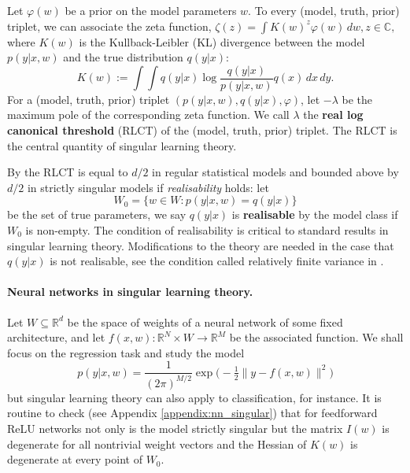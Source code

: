 \documentclass[11pt]{article}
\def\lto{\longrightarrow}
\numberwithin{equation}{section}
\theoremstyle{plain}
\theoremstyle{definition}
\newtheorem{definition}{Definition}
\begin{document}
Let  $\varphi(w)$ be a prior on the model parameters $w$.
To every (model, truth, prior) triplet, we can associate the zeta function,
$
\zeta(z) = \int K(w)^z \varphi(w) \,dw, z \in \mathbb C,
$
where $K(w)$ is the Kullback-Leibler (KL) divergence between the model $p(y|x,w)$ and the true distribution $q(y|x)$:
\begin{equation}
	K(w) := \int \!\int q(y|x) \log \frac{ q(y|x) }{ p(y|x,w) } q(x) \,dx \,dy.
	\label{eq:KL}
\end{equation}
For a (model, truth, prior) triplet $(p(y|x,w),q(y|x),\varphi)$, let $-\lambda$ be the maximum pole of the corresponding zeta function. We call $\lambda$ the \textbf{real log canonical threshold} (RLCT) \citep{watanabe_algebraic_2009} of the (model, truth, prior) triplet. The RLCT is the central quantity of singular learning theory. 

By {\citet[Theorem 6.4]{watanabe_algebraic_2009}} the RLCT is equal to $d/2$ in regular statistical models and bounded above by $d/2$ in strictly singular models if \textit{realisability} holds: let 
$$
W_0 = \{w \in W: p(y|x,w)=q(y|x)\}
$$
be the set of true parameters,
we say $q(y|x)$ is \textbf{realisable} by the model class if $W_0$ is non-empty.
The condition of realisability is critical to standard results in singular learning theory. Modifications to the theory are needed in the case that $q(y|x)$ is not realisable, see the condition called relatively finite variance in \citet{watanabe_mathematical_2018}.

\paragraph{Neural networks in singular learning theory.} Let $W \subseteq \mathbb{R}^d$ be the space of weights of a neural network of some fixed architecture, and let $f(x,w): \mathbb{R}^N \times W \lto \mathbb{R}^M$ be the associated function. We shall focus on the regression task and study the model
\begin{equation}
	p(y|x,w) = \frac{1}{(2 \pi)^{M/2}} \exp\Big(-\tfrac{1}{2} \| y - f(x,w) \|^2 \Big)
	\label{eq:gaussian_model_in_w}
\end{equation}
but singular learning theory can also apply to classification, for instance. 
It is routine to check (see Appendix \ref{appendix:nn_singular}) that for feedforward ReLU networks not only is the model strictly singular but the matrix $I(w)$ is degenerate for all nontrivial weight vectors and the Hessian of $K(w)$ is degenerate at every point of $W_0$.
\end{document}
